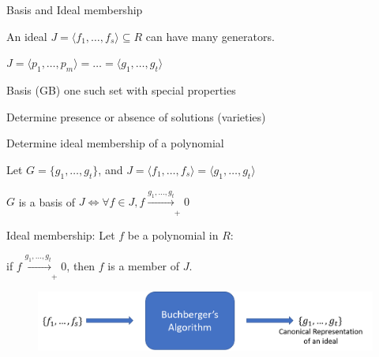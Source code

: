 \begin{frame}{\large \Grobner Basis and Ideal membership}
\bi
	\item An ideal $J = \langle f_1,\dots,f_s\rangle \subseteq R$ can have many generators. 
	\bi
		\item $J = \langle p_1,\dots,p_m\rangle = \dots = \langle g_1,\dots,g_t\rangle$
	\ei
	\vspace{0.1in}
	\item \Grobner Basis (GB) one such set with special properties
	\bi
		\item Determine presence or absence of solutions (varieties)
		\item Determine ideal membership of a polynomial
	\ei
	\vspace{0.1in}
	\item Let $G = \{g_1,\dots,g_t \}$, and $J =  \langle f_1,\dots,f_s\rangle = \langle g_1,\dots,g_t\rangle$
	\bi
	\item $G$ is a \Grobner basis of $J \iff \forall f \in J, f \xrightarrow[]{g_1,\dots,g_t}_+ 0$ 
	\item Ideal membership: Let $f$ be a polynomial in $R$:
	\bi
		\item if $f \xrightarrow[]{g_1,\dots,g_t}_+ 0$, then $f$ is a member of $J$. 
	\ei
	\ei
\ei
\begin{figure}
\centering
\includegraphics[scale=0.35]{GB.png}
\end{figure}
\end{frame}




